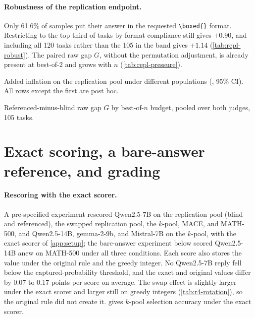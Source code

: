 \paragraph{Robustness of the replication endpoint.}
Only 61.6\% of samples put their answer in the requested \texttt{\textbackslash boxed\{\}} format. Restricting to the top third of tasks by format compliance still gives $+0.90$, and including all 120 tasks rather than the 105 in the band gives $+1.14$ (\cref{tab:repl-robust}). The paired raw gap $G$, without the permutation adjustment, is already present at best-of-2 and grows with $n$ (\cref{tab:repl-pressure}).

\begin{table}[htbp]
\centering
\caption{Added inflation on the replication pool under different populations (\sd, 95\% CI). All rows except the first are post hoc.}
\label{tab:repl-robust}
\footnotesize
\begin{adjustbox}{max width=\linewidth}\end{adjustbox}

\end{table}

\begin{table}[htbp]
\centering
\caption{Referenced-minus-blind raw gap $G$ by best-of-$n$ budget, pooled over both judges, 105 tasks.\ph}
\label{tab:repl-pressure}
\footnotesize
\begin{adjustbox}{max width=\linewidth}\end{adjustbox}

\end{table}

\FloatBarrier
\section{Exact scoring, a bare-answer reference, and grading}
\label{app:estimator}

\paragraph{Rescoring with the exact scorer.}
A pre-specified experiment rescored Qwen2.5-7B on the replication pool (blind and referenced), the swapped replication pool, the $k$-pool, \textsc{MACE}, and MATH-500, and Qwen2.5-14B, gemma-2-9b, and Mistral-7B on the $k$-pool, with the exact scorer of \cref{app:setup}; the bare-answer experiment below scored Qwen2.5-14B anew on MATH-500 under all three conditions. Each score also stores the value under the original rule and the greedy integer. No Qwen2.5-7B reply fell below the captured-probability threshold, and the exact and original values differ by 0.07 to 0.17 points per score on average. The swap effect is slightly larger under the exact scorer and larger still on greedy integers (\cref{tab:r4-rotation}), so the original rule did not create it.  gives $k$-pool selection accuracy under the exact scorer.\pre

